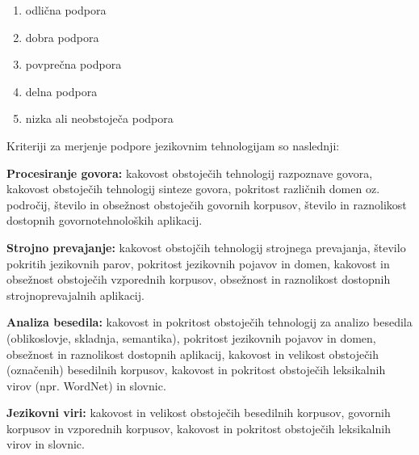 \begin{multicols}{2}
\begin{enumerate}
\item odlična podpora
\item dobra podpora
\item povprečna podpora
\item delna podpora
\item nizka ali neobstoječa podpora
\end{enumerate}

Kriteriji za merjenje podpore jezikovnim tehnologijam so naslednji:

\textbf{Procesiranje govora:} kakovost obstoječih tehnologij razpoznave govora, kakovost obstoječih tehnologij sinteze go\-vora, pokritost različnih domen oz. področij, število in obsežnost obstoječih go\-vornih korpusov, število in raznolikost dostopnih go\-vornotehnoloških aplikacij.

\textbf{Strojno prevajanje:} kakovost obstojčih tehnologij stroj\-nega prevajanja, število pokritih jezikovnih parov, pokritost jezikovnih pojavov in domen, kakovost in obsežnost obstoječih vzporednih korpusov, obsežnost in raznolikost dostopnih stroj\-noprevajalnih aplikacij.

\textbf{Analiza besedila:} kakovost in pokritost obstoječih tehnologij za analizo besedila (oblikoslovje, skladnja, semantika), pokritost jezikovnih pojavov in domen, obsežnost in raznolikost dostopnih aplikacij, kakovost in velikost obstoječih (označenih) besedilnih korpusov, kakovost in pokritost obstoječih leksikalnih virov (npr. WordNet) in slovnic.

\textbf{Jezikovni viri:} kakovost in velikost obstoječih besedilnih korpusov, go\-vornih korpusov in vzporednih korpusov, kakovost in pokritost obstoječih leksikalnih virov in slovnic.


\end{multicols}
